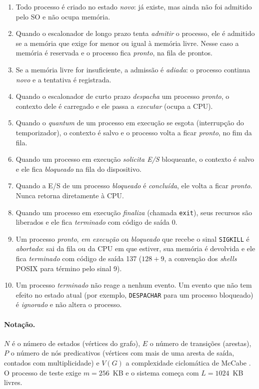\documentclass[11pt,a4paper]{article}
\theoremstyle{definition}
\newcommand{\ev}[1]{\texttt{\small #1}}    %
\newcommand{\VG}{V(G)}
\begin{document}
\begin{enumerate}[label=\textbf{R\arabic*.}, leftmargin=2.6em]
  \item Todo processo é criado no estado \emph{novo}: já existe, mas ainda não foi admitido pelo
        SO e não ocupa memória.
  \item Quando o escalonador de longo prazo tenta \emph{admitir} o processo, ele é admitido se a
        memória que exige for menor ou igual à memória livre. Nesse caso a memória é reservada e o
        processo fica \emph{pronto}, na fila de prontos.
  \item Se a memória livre for insuficiente, a admissão é \emph{adiada}: o processo continua
        \emph{novo} e a tentativa é registrada.
  \item Quando o escalonador de curto prazo \emph{despacha} um processo \emph{pronto}, o contexto dele é
        carregado e ele passa a \emph{executar} (ocupa a CPU).
  \item Quando o \emph{quantum} de um processo em execução se esgota (interrupção do temporizador), o
        contexto é salvo e o processo volta a ficar \emph{pronto}, no fim da fila.
  \item Quando um processo em execução \emph{solicita E/S} bloqueante, o contexto é salvo e ele fica
        \emph{bloqueado} na fila do dispositivo.
  \item Quando a E/S de um processo \emph{bloqueado} é \emph{concluída}, ele volta a ficar \emph{pronto}.
        Nunca retorna diretamente à CPU.
  \item Quando um processo em execução \emph{finaliza} (chamada \texttt{exit}), seus recursos são
        liberados e ele fica \emph{terminado} com código de saída 0.
  \item Um processo \emph{pronto}, \emph{em execução} ou \emph{bloqueado} que recebe o sinal
        \texttt{SIGKILL} é \emph{abortado}: sai da fila ou da CPU em que estiver, sua memória é
        devolvida e ele fica \emph{terminado} com código de saída 137 ($128+9$, a convenção dos
        \emph{shells} POSIX para término pelo sinal 9).
  \item Um processo \emph{terminado} não reage a nenhum evento. Um evento que não tem efeito no
        estado atual (por exemplo, \ev{DESPACHAR} para um processo bloqueado) é \emph{ignorado} e
        não altera o processo.
\end{enumerate}

\paragraph{Notação.} $N$ é o número de estados (vértices do grafo), $E$ o número de transições
(arestas), $P$ o número de nós predicativos (vértices com mais de uma aresta de saída, contados
com multiplicidade) e $\VG$ a complexidade ciclomática de McCabe \cite{mccabe}. O processo de teste
exige $m = 256$~KB e o sistema começa com $L = 1024$~KB livres.
\end{document}
